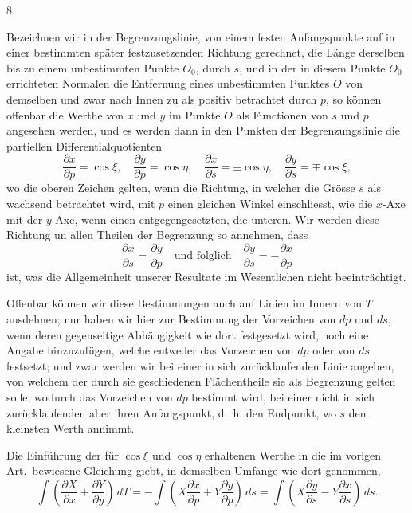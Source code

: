 \documentclass[a4paper,12pt]{article}
\begin{document}
\medbreak

\centerline{8.}

\nobreak\medskip

Bezeichnen wir in der Begrenzungslinie, von einem festen
Anfangspunkte auf in einer bestimmten sp\"{a}ter festzusetzenden
Richtung gerechnet, die L\"{a}nge derselben bis zu einem
unbestimmten Punkte $O_0$, durch $s$, und in der in diesem Punkte
$O_0$ errichteten Normalen die Entfernung eines unbestimmten
Punktes $O$ von demselben und zwar nach Innen zu als positiv
betrachtet durch $p$, so k\"{o}nnen offenbar die Werthe von $x$
und $y$ im Punkte $O$ als Functionen von $s$ und $p$ angesehen
werden, und es werden dann in den Punkten der Begrenzungslinie
die partiellen Differentialquotienten
\[ \frac{\partial x}{\partial p} = \cos \xi,\quad
   \frac{\partial y}{\partial p} = \cos \eta,\quad
   \frac{\partial x}{\partial s} = \pm \cos \eta,\quad
   \frac{\partial y}{\partial s} = \mp \cos \xi,\]
wo die oberen Zeichen gelten, wenn die Richtung, in welcher die
Gr\"{o}sse $s$ als wachsend betrachtet wird, mit $p$ einen
gleichen Winkel einschliesst, wie die $x$-Axe mit der $y$-Axe,
wenn einen entgegengesetzten, die unteren.  Wir werden diese
Richtung un allen Theilen der Begrenzung so annehmen, dass
\[ \frac{\partial x}{\partial s}
      = \frac{\partial y}{\partial p}
\quad\mbox{und folglich}\quad
   \frac{\partial y}{\partial s}
      = - \frac{\partial x}{\partial p} \]
ist, was die Allgemeinheit unserer Resultate im Wesentlichen
nicht beeintr\"{a}chtigt.

Offenbar k\"{o}nnen wir diese Bestimmungen auch auf Linien im
Innern von $T$ ausdehnen; nur haben wir hier zur Bestimmung der
Vorzeichen von $dp$ und $ds$, wenn deren gegenseitige
Abh\"{a}ngigkeit wie dort festgesetzt wird, noch eine Angabe
hinzuzuf\"{u}gen, welche entweder das Vorzeichen von $dp$ oder
von $ds$ festsetzt; und zwar werden wir bei einer in sich
zur\"{u}cklaufenden Linie angeben, von welchem der durch sie
geschiedenen Fl\"{a}chentheile sie als Begrenzung gelten solle,
wodurch das Vorzeichen von $dp$ bestimmt wird, bei einer nicht in
sich zur\"{u}cklaufenden aber ihren Anfangspunkt, d.~h. den
Endpunkt, wo $s$ den kleinsten Werth annimmt.

Die Einf\"{u}hrung der f\"{u}r $\cos \xi$ und $\cos \eta$
erhaltenen Werthe in die im vorigen Art.\ bewiesene Gleichung
giebt, in demselben Umfange wie dort genommen,
\[ \int  \left(
            \frac{\partial X}{\partial x}
          + \frac{\partial Y}{\partial y}
         \right) \, dT
  = - \int \left(
            X \frac{\partial x}{\partial p}
          + Y \frac{\partial y}{\partial p}
         \right) \, ds
  = \int \left(
            X \frac{\partial y}{\partial s}
          - Y \frac{\partial x}{\partial s}
         \right) \, ds.\]
\end{document}
